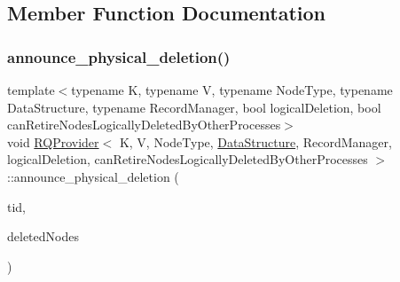 \subsection{Member Function Documentation}
\mbox{\label{classRQProvider_a29337e6766144d1c1a9aa752fe73fabf}} 
\subsubsection{\texorpdfstring{announce\+\_\+physical\+\_\+deletion()}{announce\_physical\_deletion()}\hspace{0.1cm}{\footnotesize\ttfamily [1/5]}}
{\footnotesize\ttfamily template$<$typename K, typename V, typename Node\+Type, typename Data\+Structure, typename Record\+Manager, bool logical\+Deletion, bool can\+Retire\+Nodes\+Logically\+Deleted\+By\+Other\+Processes$>$ \\
void \hyperlink{classRQProvider}{R\+Q\+Provider}$<$ K, V, Node\+Type, \hyperlink{classDataStructure}{Data\+Structure}, Record\+Manager, logical\+Deletion, can\+Retire\+Nodes\+Logically\+Deleted\+By\+Other\+Processes $>$\+::announce\+\_\+physical\+\_\+deletion (\begin{DoxyParamCaption}\item[{const int}]{tid,  }\item[{Node\+Type $\ast$const $\ast$const}]{deleted\+Nodes }\end{DoxyParamCaption})\hspace{0.3cm}{\ttfamily [inline]}}

\mbox{\label{classRQProvider_a29337e6766144d1c1a9aa752fe73fabf}} 

